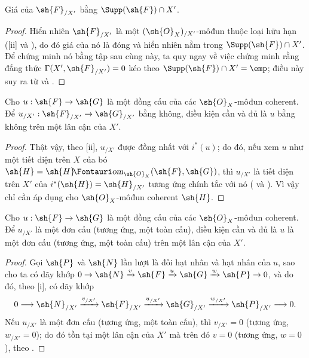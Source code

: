 \documentclass[oneside]{amsart}
\makeatletter
\newcommand{\ega@arrow}[2]{\mathchoice{#1}{#2}{#2}{#2}}
\renewcommand{\to}{\ega@arrow{\longrightarrow}{\rightarrow}}
\newcommand*{\ega@sheafop}[3]{\sh{#1}#2\textup{\kern-2.2pt{\Fontauri\slshape #3}}}
\newcommand*{\shHom}{\ega@sheafop{H}{}{om}}
\newcommand{\oldpage}[2][]{{\marginnote{\normalfont\textbf{#1}~|~#2}}\ignorespaces}
\let\EGAOriginalLabel\label
\renewcommand{\label}[1]{\phantomsection\EGAOriginalLabel{#1}}
\makeatother
\begin{document}
\begin{corollary}[10.8.12]
\label{I.10.8.12}
Giá của $\sh{F}_{/X'}$ bằng $\Supp(\sh{F})\cap X'$.
\end{corollary}

\begin{proof}
Hiển nhiên $\sh{F}_{/X'}$ là một $(\sh{O}_X)_{/X'}$-môđun thuộc loại hữu hạn ([ii] và ),
\oldpage[I]{198}
do đó giá của nó là đóng  và hiển nhiên nằm trong $\Supp(\sh{F})\cap X'$.
Để chứng minh nó bằng tập sau cùng này, ta quy ngay về việc chứng minh rằng đẳng thức $\Gamma(X',\sh{F}_{/X'})=0$ kéo theo $\Supp(\sh{F})\cap X'=\emp$; điều này suy ra từ  và .
\end{proof}

\begin{corollary}[10.8.13]
\label{I.10.8.13}
Cho $u:\sh{F}\to\sh{G}$ là một đồng cấu của các $\sh{O}_X$-môđun coherent.
Để $u_{/X'}:\sh{F}_{/X'}\to\sh{G}_{/X'}$ bằng không, điều kiện cần và đủ là $u$ bằng không trên một lân cận của $X'$.
\end{corollary}

\begin{proof}
Thật vậy, theo [ii], $u_{/X'}$ được đồng nhất với $i^*(u)$; do đó, nếu xem $u$ như một tiết diện trên $X$ của bó $\sh{H}=\shHom_{\sh{O}_X}(\sh{F},\sh{G})$, thì $u_{/X'}$ là tiết diện trên $X'$ của $i^*(\sh{H})=\sh{H}_{/X'}$ tương ứng chính tắc với nó ( và ).
Vì vậy chỉ cần áp dụng  cho $\sh{O}_X$-môđun coherent $\sh{H}$.
\end{proof}

\begin{corollary}[10.8.14]
\label{I.10.8.14}
Cho $u:\sh{F}\to\sh{G}$ là một đồng cấu của các $\sh{O}_X$-môđun coherent.
Để $u_{/X'}$ là một đơn cấu (tương ứng, một toàn cấu), điều kiện cần và đủ là $u$ là một đơn cấu (tương ứng, một toàn cấu) trên một lân cận của $X'$.
\end{corollary}

\begin{proof}
Gọi $\sh{P}$ và $\sh{N}$ lần lượt là đối hạt nhân và hạt nhân của $u$, sao cho ta có dãy khớp $0\to\sh{N}\xrightarrow{v}\sh{F}\xrightarrow{u}\sh{G}\xrightarrow{w}\sh{P}\to 0$, và do đó, theo [i], có dãy khớp
\[
  0\to\sh{N}_{/X'}\xrightarrow{v_{/X'}}\sh{F}_{/X'}\xrightarrow{u_{/X'}}\sh{G}_{/X'}\xrightarrow{w_{/X'}}\sh{P}_{/X'}\to 0.
\]
Nếu $u_{/X'}$ là một đơn cấu (tương ứng, một toàn cấu), thì $v_{/X'}=0$ (tương ứng, $w_{/X'}=0$); do đó tồn tại một lân cận của $X'$ mà trên đó $v=0$ (tương ứng, $w=0$), theo .
\end{proof}
\end{document}
